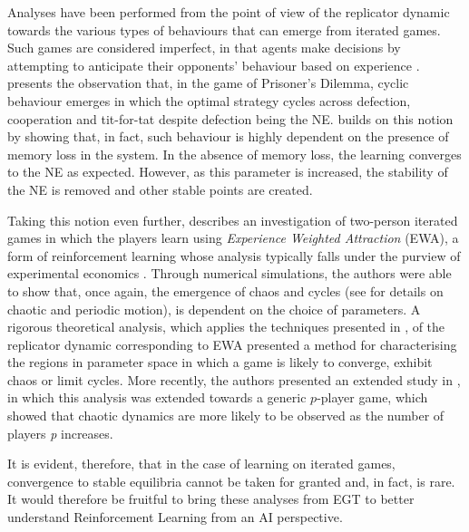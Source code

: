 \documentclass[sigconf]{aamas}
\begin{document}
Analyses have been performed from the point of view of the replicator dynamic towards the various types of behaviours that can emerge from iterated games. Such games are considered imperfect, in that agents make decisions by attempting to anticipate their opponents' behaviour based on experience \cite{Galla2011}. \cite{Imhof2005} presents the observation that, in the game of Prisoner's Dilemma, cyclic behaviour emerges in which the optimal strategy cycles across defection, cooperation and tit-for-tat despite defection being the NE. \cite{Galla2011} builds on this notion by showing that, in fact, such behaviour is highly dependent on the presence of memory loss in the system. In the absence of memory loss, the learning converges to the NE as expected. However, as this parameter is increased, the stability of the NE is removed and other stable points are created. 

Taking this notion even further,  \cite{Galla2013} describes an investigation of two-person iterated games in which the players learn using \textit{Experience Weighted Attraction} (EWA), a form of reinforcement learning whose analysis typically falls under the purview of experimental economics \cite{Camerer2009}. Through numerical simulations, the authors were able to show that, once again, the emergence of chaos and cycles (see \cite{Strogatz2000} for details on chaotic and periodic motion), is dependent on the choice of parameters. A rigorous theoretical analysis, which applies the techniques presented in \cite{Opper1992}, of the replicator dynamic corresponding to EWA presented a method for characterising the regions in parameter space in which a game is likely to converge, exhibit chaos or limit cycles. More recently, the authors presented an extended study in \cite{Sanders2018}, in which this analysis was extended towards a generic $p$-player game, which showed that chaotic dynamics are more likely to be observed as the number of players \textit{p} increases.

It is evident, therefore, that in the case of learning on iterated games, convergence to stable equilibria cannot be taken for granted and, in fact, is rare. It would therefore be fruitful to bring these analyses from EGT to better understand Reinforcement Learning from an AI perspective.
\end{document}
